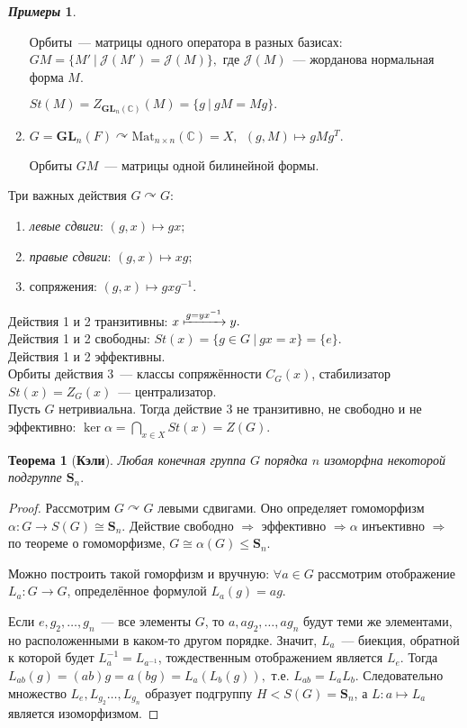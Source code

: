 \documentclass[a4paper, 14pt]{extarticle}
\newcommand{\n}{\par}
\newcommand{\complex}{\mathbb{C}}
\newcommand{\GL}{\mathbf{GL}}
\newcommand{\symmetrical}{\mathbf{S}}
\theoremstyle{definition}
\newtheorem*{exmpls}{\textit{Примеры}}
\theoremstyle{plain}
\newtheorem*{theorem*}{Теорема}
\numberwithin{theorem}{section}
\numberwithin{definition}{section}
\numberwithin{statement}{section}
\numberwithin{lemma}{section}
\numberwithin{consequence}{section}
\begin{document}
\begin{exmpls}
\begin{enumerate}
                Орбиты~--- матрицы одного оператора в разных базисах: ${GM = \{M' \ | \ \mathcal{J}(M') = \mathcal{J}(M)\},}$ где $\mathcal{J}(M)$~--- жорданова нормальная форма $M$.\n
                ${St(M) = Z_{\GL_n(\complex)}(M) = \{g \ | \ gM = Mg\}.}$
                \item ${G = \GL_n(F) \curvearrowright \mathrm{Mat}_{n \times n}(\complex) = X, \ \ (g,M) \mapsto gMg^T.}$\n
                Орбиты $GM$~--- матрицы одной билинейной формы.
            \end{enumerate}
            Три важных действия ${G \curvearrowright G}$:
            \begin{enumerate}
                \setlength\itemsep{0.1em}
                \item \textit{левые сдвиги}: ${(g,x) \mapsto gx;}$
                \item \textit{правые сдвиги}: ${(g,x) \mapsto xg;}$
                \item сопряжения: ${(g,x) \mapsto gxg^{-1}.}$
            \end{enumerate}
            Действия 1 и 2 транзитивны: ${x \xmapsto{g=yx^{-1}}y.}$\\
            Действия 1 и 2 свободны: ${St(x) = \{g \in G \ | \ gx = x\} = \{e\}.}$\\
            Действия 1 и 2 эффективны.\\
            Орбиты действия 3~--- классы сопряжённости $C_G(x)$, стабилизатор ${St(x) = Z_G(x)}$~--- централизатор.\\
            Пусть $G$ нетривиальна. Тогда действие 3 не транзитивно, не свободно и не эффективно: ${\ker \alpha = \displaystyle\bigcap_{x \in X} St(x) = Z(G).}$
        \end{exmpls}
        \begin{theorem*}[\textbf{Кэли}]
		Любая конечная группа $G$ порядка $n$ изоморфна некоторой подгруппе $\symmetrical_n.$
	\end{theorem*}
	\begin{proof}
            Рассмотрим ${G \curvearrowright G}$ левыми сдвигами. Оно определяет гомоморфизм ${\alpha : G \rightarrow S(G) \cong \symmetrical_n.}$ Действие свободно $\Rightarrow$ эффективно ${\Rightarrow \alpha}$ инъективно $\Rightarrow$ по теореме о гомоморфизме, ${G \cong \alpha(G) \leqslant \symmetrical_n.}$\n
		  Можно построить такой гоморфизм и вручную: ${\forall {a \in G}}$ рассмотрим отображение ${L_a : G \rightarrow G}$, определённое формулой ${L_a(g) = ag.}$\n
          Если $e, g_2,\ldots,g_n$~--- все элементы $G$, то $a, ag_2,\ldots,ag_n$ будут теми же элементами, но расположенными в каком-то другом порядке. Значит, $L_a$~--- биекция, обратной к которой будет $L_a^{-1} = L_{a^{-1}}$, тождественным отображением является $L_e$. Тогда $L_{ab}(g) = (ab)g = a(bg) = L_a(L_b(g)),$ т.е. $L_{ab} = L_a L_b.$ Следовательно множество $L_e, L_{g_2}\ldots,L_{g_n}$ образует подгруппу ${H < S(G) = \symmetrical_n}$, а ${L : a \mapsto L_a}$ является изоморфизмом.
	\end{proof}
\end{document}
